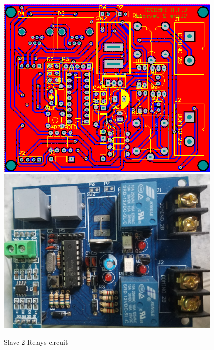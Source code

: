 \begin{figure}[!htbp]
    \begin{center}
    \includegraphics[scale=0.7]{images/s2rLayout.png}\\

    \includegraphics[scale=0.12]{images/s2r.jpg}
    \caption{Slave 2 Relays circuit}
    \label{fig:slave2RelaysCircuit}
    \end{center}
\end{figure}

